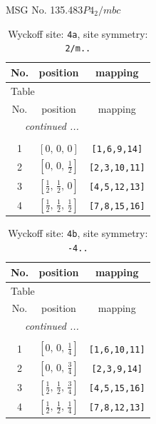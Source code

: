 \documentclass[fleqn,8pt]{jsarticle}
\begin{document}
\setcounter{MaxMatrixCols}{32}

\renewcommand{\tablename}{Table~}
\renewcommand{\figurename}{Figure~}
\begin{center}
\LARGE
MSG No. 135.483\quad$P4_{2}/mbc$
\end{center}
\renewcommand{\arraystretch}{1.2}
\begin{longtable}{ccc}
\caption{Wyckoff site: {\tt 4a}, site symmetry: {\tt 2/m..}}
 \\
 \hline \hline
No. & position & mapping \\ \hline \endfirsthead

\multicolumn{2}{l}{\tablename\ \thetable{}} \\
 \hline \hline
No. & position & mapping \\ \hline \endhead

 \hline \hline
\multicolumn{2}{r}{\footnotesize\it continued ...} \\ \endfoot

 \hline \hline
\multicolumn{2}{r}{} \\ \endlastfoot

1 & $\left[ 0,\, 0,\, 0 \right]$ & {\tt [1,6,9,14]} \\ \hline
2 & $\left[ 0,\, 0,\, \frac{1}{2} \right]$ & {\tt [2,3,10,11]} \\ \hline
3 & $\left[ \frac{1}{2},\, \frac{1}{2},\, 0 \right]$ & {\tt [4,5,12,13]} \\ \hline
4 & $\left[ \frac{1}{2},\, \frac{1}{2},\, \frac{1}{2} \right]$ & {\tt [7,8,15,16]} \\
\end{longtable}
\renewcommand{\arraystretch}{1.2}
\begin{longtable}{ccc}
\caption{Wyckoff site: {\tt 4b}, site symmetry: {\tt -4..}}
 \\
 \hline \hline
No. & position & mapping \\ \hline \endfirsthead

\multicolumn{2}{l}{\tablename\ \thetable{}} \\
 \hline \hline
No. & position & mapping \\ \hline \endhead

 \hline \hline
\multicolumn{2}{r}{\footnotesize\it continued ...} \\ \endfoot

 \hline \hline
\multicolumn{2}{r}{} \\ \endlastfoot

1 & $\left[ 0,\, 0,\, \frac{1}{4} \right]$ & {\tt [1,6,10,11]} \\ \hline
2 & $\left[ 0,\, 0,\, \frac{3}{4} \right]$ & {\tt [2,3,9,14]} \\ \hline
3 & $\left[ \frac{1}{2},\, \frac{1}{2},\, \frac{3}{4} \right]$ & {\tt [4,5,15,16]} \\ \hline
4 & $\left[ \frac{1}{2},\, \frac{1}{2},\, \frac{1}{4} \right]$ & {\tt [7,8,12,13]} \\
\end{longtable}
\end{document}
